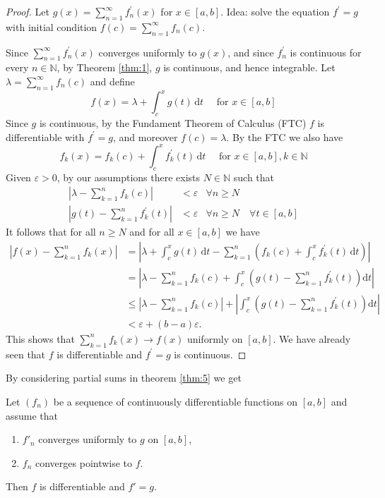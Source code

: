 \documentclass[a4paper]{article}
\begin{document}
\begin{proof}
    Let $g(x)=\sum_{n=1}^{\infty} f_{n}^{\prime}(x)$ for $x \in[a, b]$. Idea: solve the equation $f^{\prime}=g$ with initial condition $f(c)=\sum_{n=1}^{\infty} f_{n}(c)$.

    Since $\sum_{n=1}^{\infty} f_{n}^{\prime}(x)$ converges uniformly to $g(x)$, and since $f_{n}^{\prime}$ is continuous for every $n \in \mathbb{N}$, by Theorem \ref{thm:1}, $ g$ is continuous, and hence integrable. Let $\lambda=\sum_{n=1}^{\infty} f_{n}(c)$ and define
    \[
    f(x)=\lambda+\int_{c}^{x} g(t)\, \mathrm{d} t \quad \text { for } x \in[a, b]
    \]
    Since $g$ is continuous, by the Fundament Theorem of Calculus (FTC) $f$ is differentiable with $f^{\prime}=g$, and moreover $f(c)=\lambda$. By the FTC we also have
    \[
    f_{k}(x)=f_{k}(c)+\int_{c}^{x} f_{k}^{\prime}(t)\, \mathrm{d} t \quad \text { for } x \in[a, b], k \in \mathbb{N}
    \]
    Given $\varepsilon>0$, by our assumptions there exists $N \in \mathbb{N}$ such that
    \[
    \begin{array}{rll}
    \displaystyle \left|\lambda-\sum_{k=1}^{n} f_{k}(c)\right| & <\varepsilon & \forall n \geqslant N \\[15pt]
    \displaystyle \left|g(t)-\sum_{k=1}^{n} f_{k}^{\prime}(t)\right| & <\varepsilon & \forall n \geqslant N \quad \forall t \in[a, b]
    \end{array}
    \]
    It follows that for all $n \geqslant N$ and for all $x \in[a, b]$ we have
    \[
    \begin{aligned}
    \left|f(x)-\sum_{k=1}^{n} f_{k}(x)\right| &=\left|\lambda+\int_{c}^{x} g(t)\, \mathrm{d} t-\sum_{k=1}^{n}\left(f_{k}(c)+\int_{c}^{x} f_{k}^{\prime}(t) \,\mathrm{d} t\right)\right| \\
    &=\left|\lambda-\sum_{k=1}^{n} f_{k}(c)+\int_{c}^{x}\left(g(t)-\sum_{k=1}^{n} f_{k}^{\prime}(t)\right) \mathrm{d} t\right| \\
    & \leqslant\left|\lambda-\sum_{k=1}^{n} f_{k}(c)\right|+\left|\int_{c}^{x}\left(g(t)-\sum_{k=1}^{n} f_{k}^{\prime}(t)\right) \mathrm{d} t\right| \\
    &<\varepsilon+(b-a) \varepsilon.
    \end{aligned}
    \]
    This shows that $\sum_{k=1}^{n} f_{k}(x) \rightarrow f(x)$ uniformly on $[a, b]$. We have already seen that $f$ is differentiable and $f^{\prime}=g$ is continuous.
\end{proof}

By considering partial sums in theorem \ref{thm:5} we get 
\begin{theorem}
    Let $(f_n)$ be a sequence of continuously differentiable functions on $[a,b]$ and assume that 
    \begin{enumerate}
        \item $f'_n$ converges uniformly to $g$ on $[a,b]$, 
        \item $f_n$ converges pointwise to $f$.
    \end{enumerate}
    Then $f$ is differentiable and $ f'=g $. 
\end{theorem}
\end{document}
